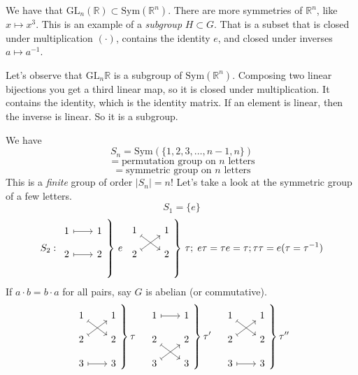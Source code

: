 \documentclass[12pt]{article}
\newcommand{\RR}{\mathbb{R}}
\newcommand{\GL}{\text{GL}}
\newcommand{\inv}[1]{#1^{-1}}
\theoremstyle{definition}
\begin{document}
We have that \( \GL_n(\RR) \subset \text{Sym}(\RR^n) \). There are more symmetries of \( \RR^n \), like
\( x \mapsto x^3 \). This is an example of a \emph{subgroup} \( H \subset G \). That is a subset
that is closed under multiplication \( (\cdot) \), contains the identity \(e\), and closed under inverses \(a\mapsto\inv{a}\).

Let's observe that \(\GL_n\RR \) is a subgroup of \(\text{Sym}(\RR^n)\). Composing
two linear bijections you get a third linear map, so it is closed under multiplication.
It contains the identity, which is the identity matrix. If an element is linear, then the inverse is linear. So it is a subgroup.

We have \[ S_n = \text{Sym}(\{1,2,3,\ldots,n-1,n\}) \]
\[ = \text{permutation group on } n \text{ letters} \]
\[ = \text{symmetric group on } n \text{ letters} \]
This is a \emph{finite} group of order \(|S_n| = n! \)
Let's take a look at the symmetric group of a few letters.
\[ S_1 = \{e\} \]
\[ S_2:
\left.\begin{tikzcd}[ column sep=2em, row sep=1em]
	1 & 1 \\
	2 & 2 \\
	\arrow[from=1-1, to=1-2, maps to]
	\arrow[from=2-1, to=2-2, maps to]
\end{tikzcd}
\right\} \,e\;
\left.\begin{tikzcd}[nodes={inner sep=4pt}, column sep=2em, row sep=1em]
	1 & 1 \\
	2 & 2 \\
	\arrow[from=1-1, to=2-2, maps to]
	\arrow[from=2-1, to=1-2, maps to]
\end{tikzcd}
\right\}\,\tau;\;
e\tau = \tau e=\tau; \tau\tau=e (\tau=\inv{\tau})
\]
If \(a\cdot b=b\cdot a\) for all pairs, say \(G\) is abelian (or commutative).
\[
\left.\begin{tikzcd}[nodes={inner sep=4pt}, column sep=2em, row sep=1em]
	1 & 1 \\
	2 & 2 \\
	3 & 3
	\arrow[from=1-1, to=2-2, maps to]
	\arrow[from=2-1, to=1-2, maps to]
	\arrow[from=3-1, to=3-2, maps to]
\end{tikzcd}\right\}\tau\quad
\left.\begin{tikzcd}[nodes={inner sep=4pt}, column sep=2em, row sep=1em]
	1 & 1 \\
	2 & 2 \\
	3 & 3
	\arrow[from=1-1, to=1-2, maps to]
	\arrow[from=2-1, to=3-2, maps to]
	\arrow[from=3-1, to=2-2, maps to]
\end{tikzcd}\right\}\tau'\quad
\left.\begin{tikzcd}[nodes={inner sep=4pt}, column sep=2em, row sep=1em]
	1 & 1 \\
	2 & 2 \\
	3 & 3
	\arrow[from=1-1, to=2-2, maps to]
	\arrow[from=2-1, to=1-2, maps to]
	\arrow[from=3-1, to=3-2, maps to]
\end{tikzcd}\right\}\tau''
\]
\end{document}
